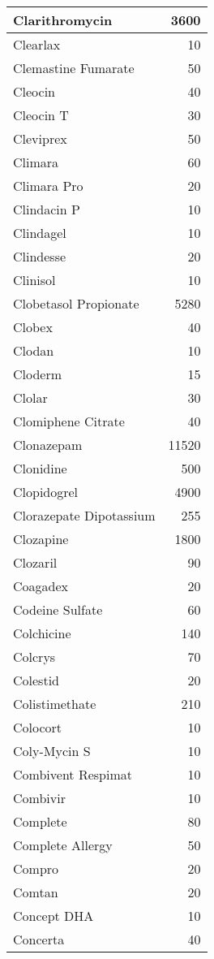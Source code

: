 \documentclass[
]{article}
\begin{document}
\begin{table}
\begin{tabular}[t]{l|r}
\hline
Clarithromycin & 3600\\
\hline
Clearlax & 10\\
\hline
Clemastine Fumarate & 50\\
\hline
Cleocin & 40\\
\hline
Cleocin T & 30\\
\hline
Cleviprex & 50\\
\hline
Climara & 60\\
\hline
Climara Pro & 20\\
\hline
Clindacin P & 10\\
\hline
Clindagel & 10\\
\hline
Clindesse & 20\\
\hline
Clinisol & 10\\
\hline
Clobetasol Propionate & 5280\\
\hline
Clobex & 40\\
\hline
Clodan & 10\\
\hline
Cloderm & 15\\
\hline
Clolar & 30\\
\hline
Clomiphene Citrate & 40\\
\hline
Clonazepam & 11520\\
\hline
Clonidine & 500\\
\hline
Clopidogrel & 4900\\
\hline
Clorazepate Dipotassium & 255\\
\hline
Clozapine & 1800\\
\hline
Clozaril & 90\\
\hline
Coagadex & 20\\
\hline
Codeine Sulfate & 60\\
\hline
Colchicine & 140\\
\hline
Colcrys & 70\\
\hline
Colestid & 20\\
\hline
Colistimethate & 210\\
\hline
Colocort & 10\\
\hline
Coly-Mycin S & 10\\
\hline
Combivent Respimat & 10\\
\hline
Combivir & 10\\
\hline
Complete & 80\\
\hline
Complete Allergy & 50\\
\hline
Compro & 20\\
\hline
Comtan & 20\\
\hline
Concept DHA & 10\\
\hline
Concerta & 40\\

\end{tabular}
\end{table}
\end{document}
